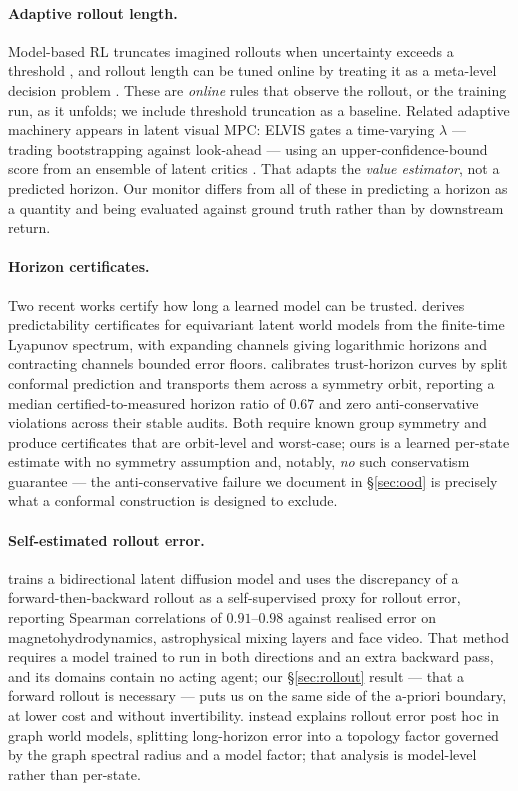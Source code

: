 \documentclass[twocolumn,10pt]{article}
\begin{document}
\paragraph{Adaptive rollout length.}
Model-based RL truncates imagined rollouts when uncertainty exceeds a threshold
\citep{janner2019mbpo}, and rollout length can be tuned online by treating it as a meta-level
decision problem \citep{bhatia2022adaptive}. These are \emph{online} rules that observe the
rollout, or the training run, as it unfolds; we include threshold truncation as a baseline.
Related adaptive machinery appears in latent visual MPC: ELVIS gates a time-varying
$\lambda$ --- trading bootstrapping against look-ahead --- using an upper-confidence-bound
score from an ensemble of latent critics \citep{du2026elvis}. That adapts the \emph{value
estimator}, not a predicted horizon. Our monitor differs from all of these in predicting a
horizon as a quantity and being evaluated against ground truth rather than by downstream
return.

\paragraph{Horizon certificates.}
Two recent works certify how long a learned model can be trusted. \citet{wang2026certified}
derives predictability certificates for equivariant latent world models from the finite-time
Lyapunov spectrum, with expanding channels giving logarithmic horizons and contracting channels
bounded error floors. \citet{wang2026conformal} calibrates trust-horizon curves by split
conformal prediction and transports them across a symmetry orbit, reporting a median
certified-to-measured horizon ratio of $0.67$ and zero anti-conservative violations across
their stable audits. Both require known group symmetry and produce certificates that are
orbit-level and worst-case; ours is a learned per-state estimate with no symmetry assumption
and, notably, \emph{no} such conservatism guarantee --- the anti-conservative failure we
document in \S\ref{sec:ood} is precisely what a conformal construction is designed to exclude.

\paragraph{Self-estimated rollout error.}
\citet{scheinker2026roundtrip} trains a bidirectional latent diffusion model and uses the
discrepancy of a forward-then-backward rollout as a self-supervised proxy for rollout error,
reporting Spearman correlations of $0.91$--$0.98$ against realised error on
magnetohydrodynamics, astrophysical mixing layers and face video. That method requires a model
trained to run in both directions and an extra backward pass, and its domains contain no
acting agent; our \S\ref{sec:rollout} result --- that a forward rollout is necessary --- puts
us on the same side of the a-priori boundary, at lower cost and without invertibility.
\citet{song2026rollout} instead explains rollout error post hoc in graph world models, splitting
long-horizon error into a topology factor governed by the graph spectral radius and a model
factor; that analysis is model-level rather than per-state.
\end{document}
